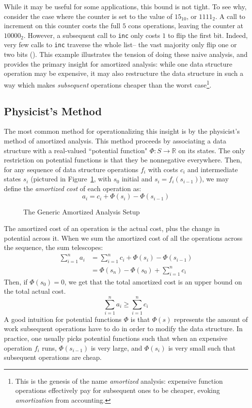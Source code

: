 While it may be useful for some applications, this bound is not tight. To see why, consider the case where the counter is set to the value of $15_{10}$, or $1111_2$. A  call to increment on this counter costs the full $5$ cons operations, leaving the counter at $10000_2$. However, a subsequent call to \texttt{inc} only costs $1$ to flip the first bit. Indeed, very few calls to \texttt{inc} traverse the whole list-- the vast majority only flip one or two bits (). This example illustrates the tension of doing these naive analysis, and provides the primary insight for amortized analysis: while one data structure operation may be expensive, it may also restructure the data structure in such a way which makes \textit{subsequent} operations cheaper than the worst case\footnote{
This is the genesis of the name \textit{amortized} analysis: expensive function operations effectively pay for subsequent ones to be cheaper, evoking \textit{amortization} from accounting.
}.

\subsection{Physicist's Method}
The most common method for operationalizing this insight is by the physicist's method of amortized analysis. This method proceeds by associating a data structure with a real-valued ``potential function" $\Phi : S \to \mathbb{R}$ on its states. The only restriction on potential functions is that they be nonnegative everywhere.
Then, for any sequence of data structure operations $f_i$ with costs $c_i$ and intermediate states $s_i$ (pictured in Figure~\ref{fig:amortized-situation}, with $s_0$ initial and $s_i = f_i(s_{i-1})$), we may define the \textit{amortized cost} of each operation as:
$$
a_i = c_i + \Phi(s_i) - \Phi(s_{i-1})
$$

\begin{figure}
  \caption{The Generic Amortized Analysis Setup}
  \label{fig:amortized-situation}
\end{figure}

The amortized cost of an operation is the actual cost, plus the change in potential across it. When we sum the amortized cost of all the operations across the sequence, the sum telescopes:
\begin{align*}
  \sum_{i=1}^n a_i &= \sum_{i=1}^n c_i + \Phi(s_i) - \Phi(s_{i-1})\\
                   &= \Phi(s_n) - \Phi(s_0) + \sum_{i=1}^n c_i
\end{align*}
Then, if $\Phi(s_0) = 0$, we get that the total amortized cost is an upper bound on the total actual cost.
$$
\sum_{i=1}^n a_i \geq \sum_{i=1}^n c_i
$$
A good intuition for potential functions $\Phi$ is that $\Phi(s)$ represents the amount of work subsequent operations have to do in order to modify the data structure.
In practice, one usually picks potential functions such that when an expensive operation $f_i$ runs, $\Phi(s_{i-1})$ is very large, and $\Phi(s_i)$ is very small such that subsequent operations are cheap.

